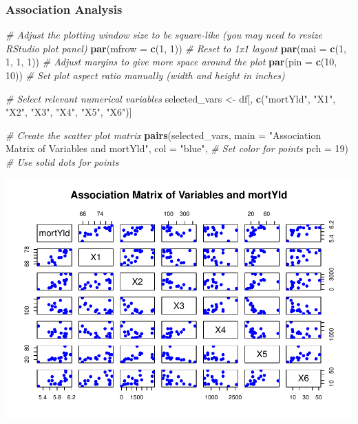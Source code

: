 \documentclass[
  12pt,
]{article}
\newenvironment{Shaded}{\begin{snugshade}}{\end{snugshade}}
\newcommand{\AttributeTok}[1]{\textcolor[rgb]{0.13,0.29,0.53}{#1}}
\newcommand{\CommentTok}[1]{\textcolor[rgb]{0.56,0.35,0.01}{\textit{#1}}}
\newcommand{\DecValTok}[1]{\textcolor[rgb]{0.00,0.00,0.81}{#1}}
\newcommand{\FunctionTok}[1]{\textcolor[rgb]{0.13,0.29,0.53}{\textbf{#1}}}
\newcommand{\NormalTok}[1]{#1}
\newcommand{\OtherTok}[1]{\textcolor[rgb]{0.56,0.35,0.01}{#1}}
\newcommand{\StringTok}[1]{\textcolor[rgb]{0.31,0.60,0.02}{#1}}
\begin{document}
\subsubsection{Association Analysis}\label{association-analysis}

\begin{Shaded}
\begin{Highlighting}[]
\CommentTok{\# Adjust the plotting window size to be square{-}like (you may need to resize RStudio plot panel)}
\FunctionTok{par}\NormalTok{(}\AttributeTok{mfrow =} \FunctionTok{c}\NormalTok{(}\DecValTok{1}\NormalTok{, }\DecValTok{1}\NormalTok{))  }\CommentTok{\# Reset to 1x1 layout}
\FunctionTok{par}\NormalTok{(}\AttributeTok{mai =} \FunctionTok{c}\NormalTok{(}\DecValTok{1}\NormalTok{, }\DecValTok{1}\NormalTok{, }\DecValTok{1}\NormalTok{, }\DecValTok{1}\NormalTok{))  }\CommentTok{\# Adjust margins to give more space around the plot}
\FunctionTok{par}\NormalTok{(}\AttributeTok{pin =} \FunctionTok{c}\NormalTok{(}\DecValTok{10}\NormalTok{, }\DecValTok{10}\NormalTok{))  }\CommentTok{\# Set plot aspect ratio manually (width and height in inches)}

\CommentTok{\# Select relevant numerical variables}
\NormalTok{selected\_vars }\OtherTok{\textless{}{-}}\NormalTok{ df[, }\FunctionTok{c}\NormalTok{(}\StringTok{"mortYld"}\NormalTok{, }\StringTok{"X1"}\NormalTok{, }\StringTok{"X2"}\NormalTok{, }\StringTok{"X3"}\NormalTok{, }\StringTok{"X4"}\NormalTok{, }\StringTok{"X5"}\NormalTok{, }\StringTok{"X6"}\NormalTok{)]}

\CommentTok{\# Create the scatter plot matrix}
\FunctionTok{pairs}\NormalTok{(selected\_vars, }
      \AttributeTok{main =} \StringTok{"Association Matrix of Variables and mortYld"}\NormalTok{,}
      \AttributeTok{col =} \StringTok{"blue"}\NormalTok{,   }\CommentTok{\# Set color for points}
      \AttributeTok{pch =} \DecValTok{19}\NormalTok{)       }\CommentTok{\# Use solid dots for points}
\end{Highlighting}
\end{Shaded}

\includegraphics{report1_r1_files/figure-latex/unnamed-chunk-5-1.pdf}
\end{document}
